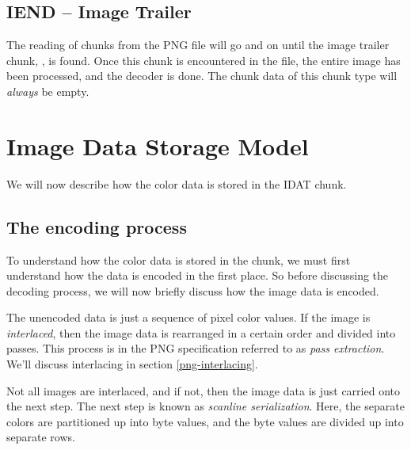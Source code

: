 \subsection{IEND -- Image Trailer}

The reading of chunks from the PNG file will go and on until the image
trailer chunk, , is found. Once this chunk is encountered
in the file, the entire image has been processed, and the decoder is
done. The chunk data of this chunk type will \textit{always} be empty.

\section{Image Data Storage Model}
\label{sec:png-image-data-storage}

We will now describe how the color data is stored in the IDAT chunk.

\subsection{The encoding process}

To understand how the color data is stored in the \IDAT chunk, we must
first understand how the data is encoded in the first place. So before
discussing the decoding process, we will now briefly discuss how the
image data is encoded.

The unencoded data is just a sequence of pixel color values. If the
image is \textit{interlaced}, then the image data is rearranged in a
certain order and divided into passes. This process is in the PNG
specification referred to as \textit{pass extraction}. We'll discuss
interlacing in section \ref{png-interlacing}.

Not all images are interlaced, and if not, then the image data is just
carried onto the next step. The next step is known as \textit{scanline
  serialization}. Here, the separate colors are partitioned up into
byte values, and the byte values are divided up into separate rows.

\newcommand{\checkerimg}{
  \tikz[scale=2]{
    \fill[gray] (0,0) rectangle (0.5ex,0.5ex);
    \fill[black] (0.5ex,0) rectangle (1.0ex,0.5ex);
    \fill[black] (0,0.5ex) rectangle (0.5ex,1.0ex);
    \fill[gray] (0.5ex,0.5ex) rectangle (1.0ex,1.0ex);
  }}

